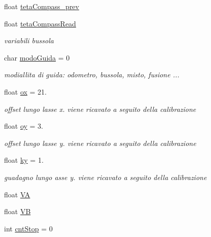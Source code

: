 \begin{DoxyCompactItemize}
\item 
float \mbox{\hyperlink{ari_pi__2_d_c__esp__08_8ino_aab8609ee95cbabd2ffeaf176b9fac768}{teta\+Compass\+\_\+prev}}
\item 
float \mbox{\hyperlink{ari_pi__2_d_c__esp__08_8ino_afae537763d72e1c7aa5bddabb567ee76}{teta\+Compass\+Read}}
\begin{DoxyCompactList}\small\item\em variabili bussola \end{DoxyCompactList}\item 
char \mbox{\hyperlink{ari_pi__2_d_c__esp__08_8ino_a0a2c5b7e5415d49d86d1c9a388128712}{modo\+Guida}} = 0
\begin{DoxyCompactList}\small\item\em modiallita\textquotesingle{} di guida\+: odometro, bussola, misto, fusione ... \end{DoxyCompactList}\item 
float \mbox{\hyperlink{ari_pi__2_d_c__esp__08_8ino_ab9355e95cf7b931e4ac76a90c7b163c6}{ox}} = 21.
\begin{DoxyCompactList}\small\item\em offset lungo l\textquotesingle{}asse x. viene ricavato a seguito della calibrazione \end{DoxyCompactList}\item 
float \mbox{\hyperlink{ari_pi__2_d_c__esp__08_8ino_a751717b9e3018eb4938a31fba5e636af}{oy}} = 3.
\begin{DoxyCompactList}\small\item\em offset lungo l\textquotesingle{}asse y. viene ricavato a seguito della calibrazione \end{DoxyCompactList}\item 
float \mbox{\hyperlink{ari_pi__2_d_c__esp__08_8ino_a707bc08df1e702c248d1a2225fefc1ce}{ky}} = 1.
\begin{DoxyCompactList}\small\item\em guadagno lungo asse y. viene ricavato a seguito della calibrazione \end{DoxyCompactList}\item 
float \mbox{\hyperlink{ari_pi__2_d_c__esp__08_8ino_a20aa2804cc392e162754639d1ec564d4}{VA}}
\item 
float \mbox{\hyperlink{ari_pi__2_d_c__esp__08_8ino_a46393dabfdc8b3c70d5811eadaedeaf4}{VB}}
\item 
int \mbox{\hyperlink{ari_pi__2_d_c__esp__08_8ino_a095b3da49a4477973982187eae80f87b}{cnt\+Stop}} = 0
\item 

\end{DoxyCompactItemize}

